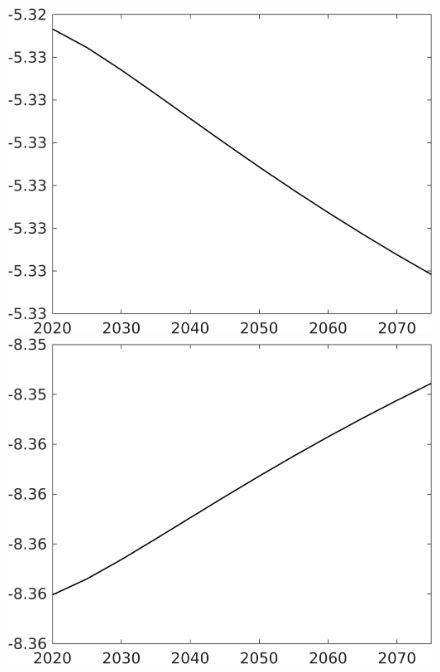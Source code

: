 \documentclass[12pt]{article}
\begin{document}
\begin{figure}[h!!]
\begin{minipage}[]{0.32\textwidth}
	\end{minipage}	
	\begin{minipage}[]{0.32\textwidth}
		\includegraphics[width=1\textwidth]{../../codding_model/own_basedOnFried/optimalPol_010922_revision/figures/all_13Sept22/CompTaul_Equlab_LFBAUPer_Reg0_hl_spillover0_nsk0_xgr1_knspil0_sep1_countec0_GovRev0_etaa0.79.png}
	\end{minipage}	
	\begin{minipage}[]{0.32\textwidth}
		\includegraphics[width=1\textwidth]{../../codding_model/own_basedOnFried/optimalPol_010922_revision/figures/all_13Sept22/CompTaul_Equlab_LFBAUPer_Reg0_C_spillover0_nsk0_xgr1_knspil0_sep1_countec0_GovRev0_etaa0.79.png}

\end{minipage}
\end{figure}
\end{document}

